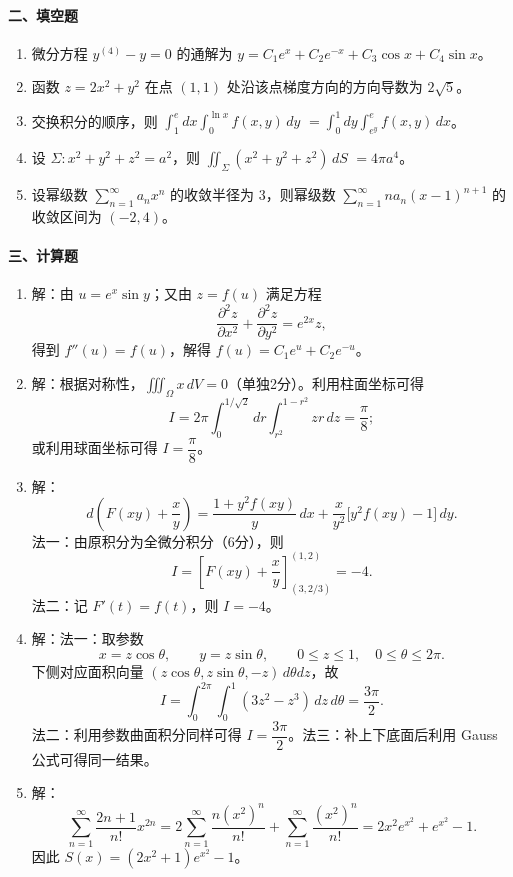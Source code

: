 \paragraph*{二、填空题}
\begin{enumerate}
  \item 微分方程 $y^{(4)}-y=0$ 的通解为 $y=C_1e^x+C_2e^{-x}+C_3\cos x+C_4\sin x$。
  \item 函数 $z=2x^2+y^2$ 在点 $(1,1)$ 处沿该点梯度方向的方向导数为 $2\sqrt5$。
  \item 交换积分的顺序，则 $\displaystyle\int_1^e dx\int_0^{\ln x} f(x,y)\,dy$ $=\displaystyle\int_0^1dy\int_{e^y}^{e}f(x,y)\,dx$。
  \item 设 $\Sigma:x^2+y^2+z^2=a^2$，则 $\displaystyle\iint_{\Sigma}(x^2+y^2+z^2)\,dS$ $=4\pi a^4$。
  \item 设幂级数 $\displaystyle\sum_{n=1}^{\infty}a_nx^n$ 的收敛半径为 $3$，则幂级数 $\displaystyle\sum_{n=1}^{\infty}n a_n(x-1)^{n+1}$ 的收敛区间为 $(-2,4)$。
\end{enumerate}

\paragraph*{三、计算题}
\begin{enumerate}
  \item 解：由 $u=e^x\sin y$；又由 $z=f(u)$ 满足方程
  \[
    \frac{\partial^2 z}{\partial x^2}
    +\frac{\partial^2 z}{\partial y^2}=e^{2x}z,
  \]
  得到 $f''(u)=f(u)$，解得 $f(u)=C_1e^u+C_2e^{-u}$。
  \item 解：根据对称性，$\displaystyle\iiint_{\Omega}x\,dV=0$（单独2分）。利用柱面坐标可得
  \[
    I=2\pi\int_0^{1/\sqrt2}dr\int_{r^2}^{1-r^2}zr\,dz
    =\frac{\pi}{8};
  \]
  或利用球面坐标可得 $I=\dfrac{\pi}{8}$。
  \item 解：
  \[
    d\left(F(xy)+\frac{x}{y}\right)
    =\frac{1+y^2f(xy)}{y}\,dx
    +\frac{x}{y^2}\bigl[y^2f(xy)-1\bigr]\,dy.
  \]
  法一：由原积分为全微分积分（6分），则
  \[
    I=\left[F(xy)+\frac{x}{y}\right]_{(3,2/3)}^{(1,2)}=-4.
  \]
  法二：记 $F'(t)=f(t)$，则 $I=-4$。
  \item 解：法一：取参数
  \[
    x=z\cos\theta,\qquad y=z\sin\theta,\qquad
    0\le z\le1,\quad 0\le\theta\le2\pi.
  \]
  下侧对应面积向量 $(z\cos\theta,z\sin\theta,-z)\,d\theta dz$，故
  \[
    I=\int_0^{2\pi}\int_0^1(3z^2-z^3)\,dz\,d\theta
    =\frac{3\pi}{2}.
  \]
  法二：利用参数曲面积分同样可得 $I=\dfrac{3\pi}{2}$。法三：补上下底面后利用 Gauss 公式可得同一结果。
  \item 解：
  \[
    \sum_{n=1}^{\infty}\frac{2n+1}{n!}x^{2n}
    =2\sum_{n=1}^{\infty}\frac{n(x^2)^n}{n!}
    +\sum_{n=1}^{\infty}\frac{(x^2)^n}{n!}
    =2x^2e^{x^2}+e^{x^2}-1.
  \]
  因此 $S(x)=(2x^2+1)e^{x^2}-1$。
\end{enumerate}

